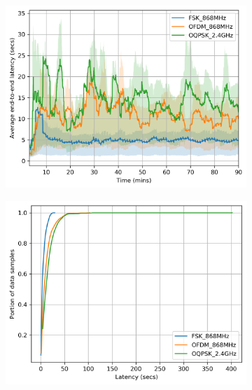 \documentclass[sensors,article,submit,moreauthors,pdftex]{Definitions/mdpi}
\begin{document}
\begin{figure}
	\centering
	\begin{subfigure}{0.49\columnwidth}
    	\centering
    	\includegraphics[width=1.00\columnwidth]{latency_time}
        \label{fig:latency_time}
	\end{subfigure}
	\begin{subfigure}{0.49\columnwidth}
		\centering
    	\includegraphics[width=1.00\columnwidth]{latency_cdf}
        \label{fig:latency_cdf}
	\end{subfigure}
	\begin{subfigure}{0.49\columnwidth}
		\centering

\end{subfigure}
\end{figure}
\end{document}
